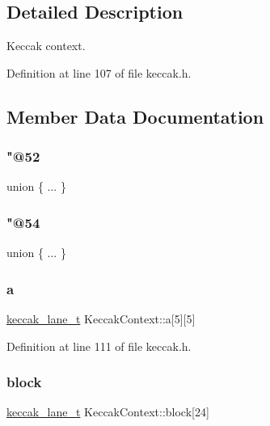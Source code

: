 \subsection{Detailed Description}
Keccak context. 

Definition at line 107 of file keccak.\+h.



\subsection{Member Data Documentation}
\mbox{\label{structKeccakContext_a579dad2a76b6371a18855e5845205ee5}} 
\subsubsection{\texorpdfstring{"@52}{@52}}
{\footnotesize\ttfamily union \{ ... \} }

\mbox{\label{structKeccakContext_a2a10132c6c4647caf99faec48bab4658}} 
\subsubsection{\texorpdfstring{"@54}{@54}}
{\footnotesize\ttfamily union \{ ... \} }

\mbox{\label{structKeccakContext_a990ac688d2a22e872cdab3d880418dc4}} 
\subsubsection{\texorpdfstring{a}{a}}
{\footnotesize\ttfamily \hyperlink{keccak_8h_ad0c0a8baa1f82943a57b85bc3dfd3abc}{keccak\+\_\+lane\+\_\+t} Keccak\+Context\+::a\mbox{[}5\mbox{]}\mbox{[}5\mbox{]}}



Definition at line 111 of file keccak.\+h.

\mbox{\label{structKeccakContext_acfa449b5cd9c15e940b11703fb4cc937}} 
\subsubsection{\texorpdfstring{block}{block}}
{\footnotesize\ttfamily \hyperlink{keccak_8h_ad0c0a8baa1f82943a57b85bc3dfd3abc}{keccak\+\_\+lane\+\_\+t} Keccak\+Context\+::block\mbox{[}24\mbox{]}}



